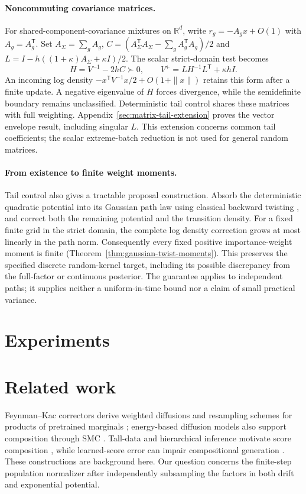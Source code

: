 \documentclass{article}
\newcommand{\R}{\mathbb R}
\begin{document}
\paragraph{Noncommuting covariance matrices.}
For shared-component-covariance mixtures on $\R^d$, write $r_g=-A_gx+O(1)$ with $A_g=A_g^{\mathsf T}$. Set $A_\Sigma=\sum_gA_g$, $C=(A_\Sigma^{\mathsf T}A_\Sigma-\sum_gA_g^{\mathsf T}A_g)/2$ and $L=I-h((1+\kappa)A_\Sigma+\kappa I)/2$. The scalar strict-domain test becomes
\[
H=V^{-1}-2hC\succ0,\qquad V^+=LH^{-1}L^{\mathsf T}+\kappa hI.
\]
An incoming log density $-x^{\mathsf T}V^{-1}x/2+O(1+\|x\|)$ retains this form after a finite update. A negative eigenvalue of $H$ forces divergence, while the semidefinite boundary remains unclassified. Deterministic tail control shares these matrices with full weighting. Appendix~\ref{sec:matrix-tail-extension} proves the vector envelope result, including singular $L$. This extension concerns common tail coefficients; the scalar extreme-batch reduction is not used for general random matrices.



\paragraph{From existence to finite weight moments.}
Tail control also gives a tractable proposal construction. Absorb the deterministic quadratic potential into its Gaussian path law using classical backward twisting \citep{whiteley2014,heng2020}, and correct both the remaining potential and the transition density. For a fixed finite grid in the strict domain, the complete log density correction grows at most linearly in the path norm. Consequently every fixed positive importance-weight moment is finite (Theorem~\ref{thm:gaussian-twist-moments}). This preserves the specified discrete random-kernel target, including its possible discrepancy from the full-factor or continuous posterior. The guarantee applies to independent paths; it supplies neither a uniform-in-time bound nor a claim of small practical variance.

\section{Experiments}\label{sec:experiments}


\section{Related work}
Feynman--Kac correctors derive weighted diffusions and resampling schemes for products of pretrained marginals \citep{skreta2025}; energy-based diffusion models also support composition through SMC \citep{thornton2025}. Tall-data and hierarchical inference motivate score composition \citep{linhart2026,arruda2026}, while learned-score error can impair compositional generation \citep{soiffer2026}. These constructions are background here. Our question concerns the finite-step population normalizer after independently subsampling the factors in both drift and exponential potential.
\end{document}
